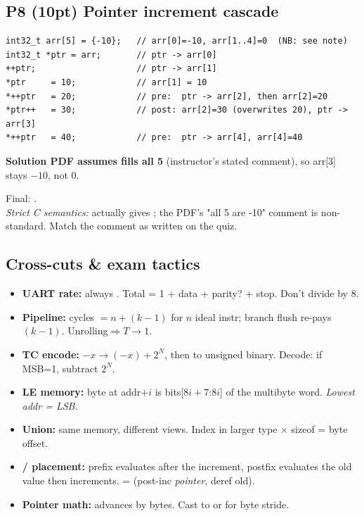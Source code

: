 \subsection{P8 (10pt) Pointer increment cascade}
\begin{lstlisting}[language={}]
int32_t arr[5] = {-10};   // arr[0]=-10, arr[1..4]=0  (NB: see note)
int32_t *ptr = arr;       // ptr -> arr[0]
++ptr;                    // ptr -> arr[1]
*ptr     = 10;            // arr[1] = 10
*++ptr   = 20;            // pre:  ptr -> arr[2], then arr[2]=20
*ptr++   = 30;            // post: arr[2]=30 (overwrites 20), ptr -> arr[3]
*++ptr   = 40;            // pre:  ptr -> arr[4], arr[4]=40
\end{lstlisting}
\textbf{Solution PDF assumes  fills all 5} (instructor's stated comment), so arr[3] stays $-10$, not $0$.
\begin{qp}
Final: .\\
\emph{Strict C semantics:}  actually gives ; the PDF's "all 5 are -10" comment is non-standard. Match the comment as written on the quiz.
\end{qp}

\subsection{Cross-cuts \& exam tactics}
\begin{itemize}
\item \textbf{UART rate:} always . Total = 1 + data + parity? + stop. Don't divide by 8.
\item \textbf{Pipeline:} cycles $= n + (k{-}1)$ for $n$ ideal instr; branch flush re-pays $(k{-}1)$. Unrolling$\Rightarrow T\to 1$.
\item \textbf{TC encode:} $-x \to (-x) + 2^N$, then to unsigned binary. Decode: if MSB=1, subtract $2^N$.
\item \textbf{LE memory:} byte at addr$+i$ is bits[$8i{+}7$:$8i$] of the multibyte word. \emph{Lowest addr = LSB.}
\item \textbf{Union:} same memory, different views. Index in larger type $\times$ sizeof = byte offset.
\item \textbf{\cee{++}/\cee{--} placement:} prefix evaluates after the increment, postfix evaluates the old value then increments.  =  (post-inc \emph{pointer}, deref old).
\item \textbf{Pointer math:}  advances by  bytes. Cast to  or  for byte stride.
\end{itemize}
